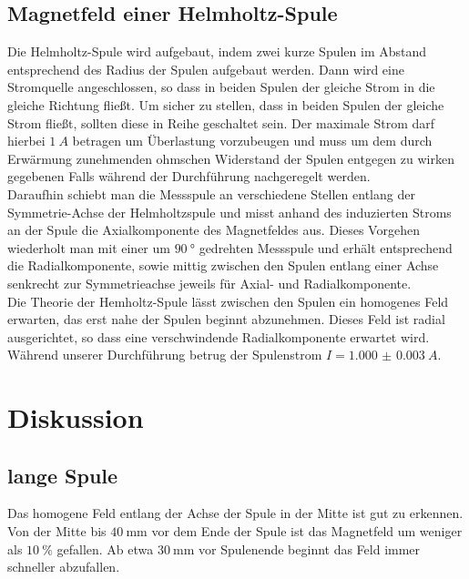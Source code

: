 \subsection{Magnetfeld einer Helmholtz-Spule}
Die Helmholtz-Spule wird aufgebaut, indem zwei kurze Spulen im Abstand entsprechend des Radius der Spulen aufgebaut werden. Dann wird eine Stromquelle angeschlossen, so dass in beiden Spulen der gleiche Strom in die gleiche Richtung fließt. Um sicher zu stellen, dass in beiden Spulen der gleiche Strom fließt, sollten diese in Reihe geschaltet sein. Der maximale Strom darf hierbei $ \SI{1}{A} $ betragen um Überlastung vorzubeugen und muss um dem durch Erwärmung zunehmenden ohmschen Widerstand der Spulen entgegen zu wirken gegebenen Falls während der Durchführung nachgeregelt werden. \\
Daraufhin schiebt man die Messspule an verschiedene Stellen entlang der Symmetrie-Achse der Helmholtzspule und misst anhand des induzierten Stroms an der Spule die Axialkomponente des Magnetfeldes aus. Dieses Vorgehen wiederholt man mit einer um $ \SI{90}{\degree} $ gedrehten Messspule und erhält entsprechend die Radialkomponente, sowie mittig zwischen den Spulen entlang einer Achse senkrecht zur Symmetrieachse jeweils für Axial- und Radialkomponente.\\
Die Theorie der Hemholtz-Spule lässt zwischen den Spulen ein homogenes Feld erwarten, das erst nahe der Spulen beginnt abzunehmen. Dieses Feld ist radial ausgerichtet, so dass eine verschwindende Radialkomponente erwartet wird. \\
Während unserer Durchführung betrug der Spulenstrom $ I= \SI{1.000(3)}{A} $.

\section{Diskussion}
\subsection{lange Spule}
Das homogene Feld entlang der Achse der Spule in der Mitte ist gut zu erkennen. Von der Mitte bis $ \SI{40}{\milli\meter} $ vor dem Ende der Spule ist das Magnetfeld um weniger als $ \SI{10}{\percent} $ gefallen. Ab etwa $ \SI{30}{\milli\meter} $ vor Spulenende beginnt das Feld immer schneller abzufallen. %
